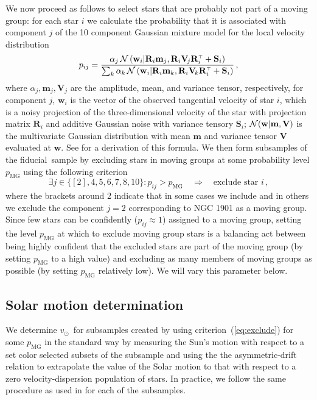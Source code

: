 \documentclass[12pt,preprint]{aastex}
\newcommand{\normal}{{\cal N}}
\renewcommand{\vec}[1]{\mathbf{#1}} %
\newcommand{\mm}{\vec{m}}
\newcommand{\ww}{\vec{w}}
\newcommand{\mmj}{\mm_j}
\newcommand{\mmk}{\mm_k}
\newcommand{\wwi}{\ww_i}
\newcommand{\ten}[1]{\mathbf{#1}} %
\newcommand{\RR}{\ten{R}}
\renewcommand{\SS}{\ten{S}}
\newcommand{\VV}{\ten{V}}
\newcommand{\RRi}{\RR_i}
\newcommand{\SSi}{\SS_i}
\newcommand{\VVj}{\VV_{\!j}} %
\newcommand{\VVk}{\VV_{\!k}} %
\newcommand{\T}{^{\scriptscriptstyle \top}}   %
\newcommand{\pmg}{p_{\mathrm{MG}}}
\newcommand{\vsunlsr}{\ensuremath{v_\odot}}
\newcommand{\fiducial}{fiducial}
\begin{document}
We now proceed as follows to select stars that are probably not part
of a moving group: for each star $i$ we calculate the probability that
it is associated with component $j$ of the 10 component Gaussian
mixture model for the local velocity distribution
\begin{equation}
p_{ij} = \frac{\alpha_j\,\normal\left(\wwi | \RRi \mmj, \RRi \VVj
\RRi\T + \SSi\right)}{\sum_k\alpha_k\,\normal\left(\wwi | \RRi \mmk, \RRi \VVk
\RRi\T+\SSi\right)}\,,
\end{equation}
where $\alpha_j,\mmj,\VVj$ are the amplitude, mean, and variance
tensor, respectively, for component $j$, $\wwi$ is the vector of the
observed tangential velocity of star $i$, which is a noisy projection
of the three-dimensional velocity of the star with projection matrix
$\RRi$ and additive Gaussian noise with variance tensory $\SSi$;
$\normal(\ww|\mm,\VV)$ is the multivariate Gaussian distribution with
mean $\mm$ and variance tensor $\VV$ evaluated at $\ww$. See
\citet{Bovy09b} for a derivation of this formula. We then form
subsamples of the \fiducial\ sample by excluding stars in moving groups at
some probability level $\pmg$ using the following criterion
\begin{equation}\label{eq:exclude}
\exists j \in \{ [2], 4,5,6,7,8,10\} : p_{ij} > \pmg \quad \Rightarrow \quad  \mbox{exclude star }i\,,
\end{equation}
where the brackets around 2 indicate that in some cases we include and
in others we exclude the component $j=2$ corresponding to NGC 1901 as
a moving group. Since few stars can be confidently ($p_{ij} \approx
1$) assigned to a moving group, setting the level $\pmg$ at which to
exclude moving group stars is a balancing act between being highly
confident that the excluded stars are part of the moving group (by
setting $\pmg$ to a high value) and excluding as many members of
moving groups as possible (by setting $\pmg$ relatively low). We will
vary this parameter below.


\subsection{Solar motion determination}

We determine \vsunlsr\ for subsamples created by using
criterion~(\ref{eq:exclude}) for some $\pmg$ in the standard way by
measuring the Sun's motion with respect to a set color selected
subsets of the subsample and using the the asymmetric-drift relation
to extrapolate the value of the Solar motion to that with respect to a
zero velocity-dispersion population of stars. In practice, we follow
the same procedure as used in \citet{Hogg05a} for each of the
subsamples.
\end{document}

